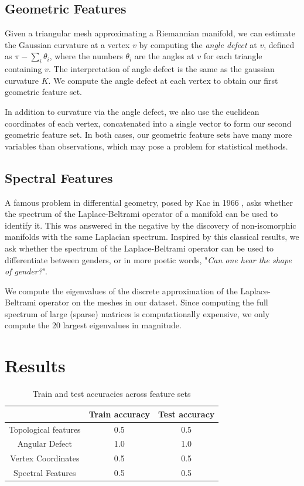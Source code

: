 \documentclass[11pt]{article}
\begin{document}
\subsection{Geometric Features}

Given a triangular mesh approximating a Riemannian manifold, we can estimate the Gaussian curvature at a vertex $v$ by computing the \textit{angle defect} at $v$, defined as $\pi - \sum_i \theta_i$, where the numbers $\theta_i$ are the angles at $v$ for each triangle containing $v$. The interpretation of angle defect is the same as the gaussian curvature $K$. We compute the angle defect at each vertex to obtain our first geometric feature set.

In addition to curvature via the angle defect, we also use the euclidean coordinates of each vertex, concatenated into a single vector to form our second geometric feature set. In both cases, our geometric feature sets have many more variables than observations, which may pose a problem for statistical methods.

\subsection{Spectral Features}

A famous problem in differential geometry, posed by Kac in 1966 \cite{Kac1966}, asks whether the spectrum of the Laplace-Beltrami operator of a manifold can be used to identify it. This was answered in the negative by the discovery of non-isomorphic manifolds with the same Laplacian spectrum. Inspired by this classical results, we ask whether the spectrum of the Laplace-Beltrami operator can be used to differentiate between genders, or in more poetic words, "\textit{Can one hear the shape of gender?}".

We compute the eigenvalues of the discrete approximation of the Laplace-Beltrami operator on the meshes in our dataset. Since computing the full spectrum of large (sparse) matrices is computationally expensive, we only compute the 20 largest eigenvalues in magnitude.

\section{Results}

\begin{table}
    \centering
    \begin{tabular}{c|c|c}
        & \textbf{Train accuracy} & \textbf{Test accuracy}\\ \hline
    Topological features & 0.5 & 0.5 \\
    Angular Defect & 1.0 & 1.0 \\
    Vertex Coordinates & 0.5 & 0.5 \\
    Spectral Features & 0.5 & 0.5\\
    \end{tabular}
    \caption{Train and test accuracies across feature sets} \label{tab:results}
\end{table}
\end{document}
